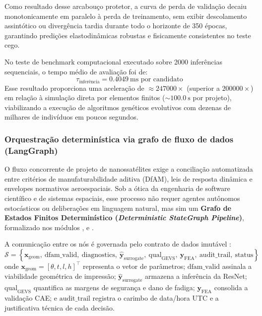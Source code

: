Como resultado desse arcabouço protetor, a curva de perda de validação decaiu monotonicamente em paralelo à perda de treinamento, sem exibir descolamento assintótico ou divergência tardia durante todo o horizonte de 350 épocas, garantindo predições elastodinâmicas robustas e fisicamente consistentes no teste cego.

No teste de benchmark computacional executado sobre \num{2000} inferências sequenciais, o tempo médio de avaliação foi de:
\begin{equation}
  \tau_{\text{inferência}} = \SI{0.4049}{\milli\second} \text{ por candidato}
  \label{eq:latencia}
\end{equation}
Esse resultado proporciona uma aceleração de $\approx \num{247000}\times$ (superior a $\num{200000}\times$) em relação à simulação direta por elementos finitos ($\sim \SI{100.0}{\second}$ por projeto), viabilizando a execução de algoritmos genéticos evolutivos com dezenas de milhares de indivíduos em poucos segundos.

\subsubsection{Orquestração determinística via grafo de fluxo de dados (LangGraph)}
\label{subsubsec:langgraph}

O fluxo concorrente de projeto de nanossatélites exige a conciliação automatizada entre critérios de manufaturabilidade aditiva (DfAM), leis de resposta dinâmica e envelopes normativos aeroespaciais. Sob a ótica da engenharia de software científico e de sistemas espaciais, esse processo não requer agentes autônomos estocásticos ou deliberações em linguagem natural, mas sim um \textbf{Grafo de Estados Finitos Determinístico (\textit{Deterministic StateGraph Pipeline})}, formalizado nos módulos ,  e .

A comunicação entre os nós é governada pelo contrato de dados imutável :
\begin{equation}
  \mathcal{S} = \left\{ \mathbf{x}_{\text{geom}},\ \text{dfam\_valid},\ \text{diagnostics},\ \hat{\mathbf{y}}_{\text{surrogate}},\ \text{qual}_{\text{GEVS}},\ \mathbf{y}_{\text{FEA}},\ \text{audit\_trail},\ \text{status} \right\}
  \label{eq:estado}
\end{equation}
onde $\mathbf{x}_{\text{geom}} = [\theta, t, l, h]^{\top}$ representa o vetor de parâmetros; $\text{dfam\_valid}$ assinala a viabilidade geométrica de impressão; $\hat{\mathbf{y}}_{\text{surrogate}}$ armazena a inferência da ResNet; $\text{qual}_{\text{GEVS}}$ quantifica as margens de segurança e dano de fadiga; $\mathbf{y}_{\text{FEA}}$ consolida a validação CAE; e $\text{audit\_trail}$ registra o carimbo de data/hora UTC e a justificativa técnica de cada decisão.

